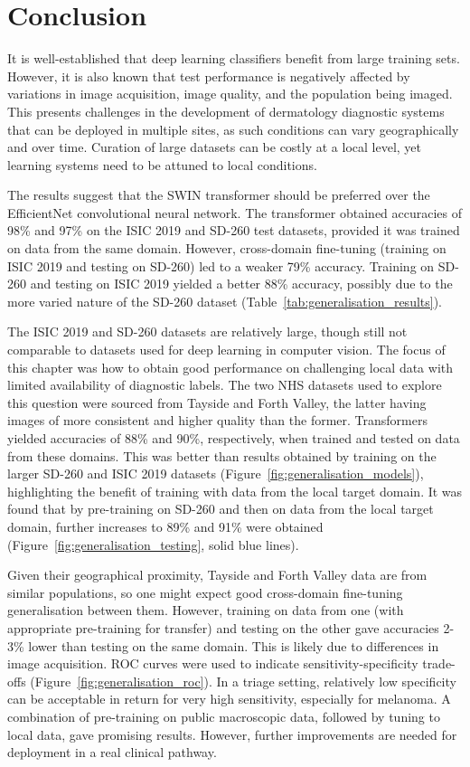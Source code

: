 \section{Conclusion}
\label{sec:generalisation_conclusion}
It is well-established that deep learning classifiers benefit from large training sets. However, it is also known that test performance is negatively affected by variations in image acquisition, image quality, and the population being imaged. This presents challenges in the development of dermatology diagnostic systems that can be deployed in multiple sites, as such conditions can vary geographically and over time. Curation of large datasets can be costly at a local level, yet learning systems need to be attuned to local conditions.

The results suggest that the SWIN transformer should be preferred over the EfficientNet convolutional neural network. The transformer obtained accuracies of 98\% and 97\% on the ISIC 2019 and SD-260 test datasets, provided it was trained on data from the same domain. However, cross-domain fine-tuning (training on ISIC 2019 and testing on SD-260) led to a weaker 79\% accuracy. Training on SD-260 and testing on ISIC 2019 yielded a better 88\% accuracy, possibly due to the more varied nature of the SD-260 dataset (Table~\ref{tab:generalisation_results}).

The ISIC 2019 and SD-260 datasets are relatively large, though still not comparable to datasets used for deep learning in computer vision. The focus of this chapter was how to obtain good performance on challenging local data with limited availability of diagnostic labels. The two NHS datasets used to explore this question were sourced from Tayside and Forth Valley, the latter having images of more consistent and higher quality than the former. Transformers yielded accuracies of 88\% and 90\%, respectively, when trained and tested on data from these domains. This was better than results obtained by training on the larger SD-260 and ISIC 2019 datasets (Figure~\ref{fig:generalisation_models}), highlighting the benefit of training with data from the local target domain. It was found that by pre-training on SD-260 and then on data from the local target domain, further increases to 89\% and 91\% were obtained (Figure~\ref{fig:generalisation_testing}, solid blue lines).

Given their geographical proximity, Tayside and Forth Valley data are from similar populations, so one might expect good cross-domain fine-tuning generalisation between them. However, training on data from one (with appropriate pre-training for transfer) and testing on the other gave accuracies 2-3\% lower than testing on the same domain. This is likely due to differences in image acquisition. ROC curves were used to indicate sensitivity-specificity trade-offs (Figure~\ref{fig:generalisation_roc}). In a triage setting, relatively low specificity can be acceptable in return for very high sensitivity, especially for melanoma. A combination of pre-training on public macroscopic data, followed by tuning to local data, gave promising results. However, further improvements are needed for deployment in a real clinical pathway.